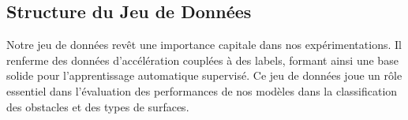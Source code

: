 \subsection{Structure du Jeu de Données}
Notre jeu de données revêt une importance capitale dans nos expérimentations. Il renferme des données d'accélération couplées à des labels, formant ainsi une base solide pour l'apprentissage automatique supervisé. Ce jeu de données joue un rôle essentiel dans l'évaluation des performances de nos modèles dans la classification des obstacles et des types de surfaces.
